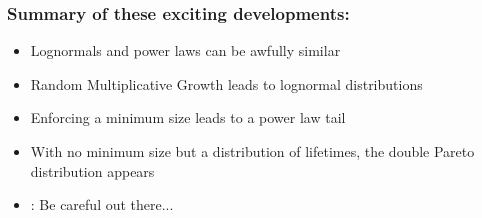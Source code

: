 \begin{frame}
  \frametitle{Summary of these exciting developments:}
  
  \begin{block}{}
  \begin{itemize}
  \item<1-> Lognormals and power laws can be \alert{awfully} similar
  \item<2-> Random Multiplicative Growth leads to lognormal distributions
  \item<3-> Enforcing a minimum size leads to a power law tail
  \item<4-> With no minimum size but a distribution of lifetimes, 
    the double Pareto distribution appears
  \item<5-> : Be careful out there...
  \end{itemize}
  \end{block}
  
\end{frame}

